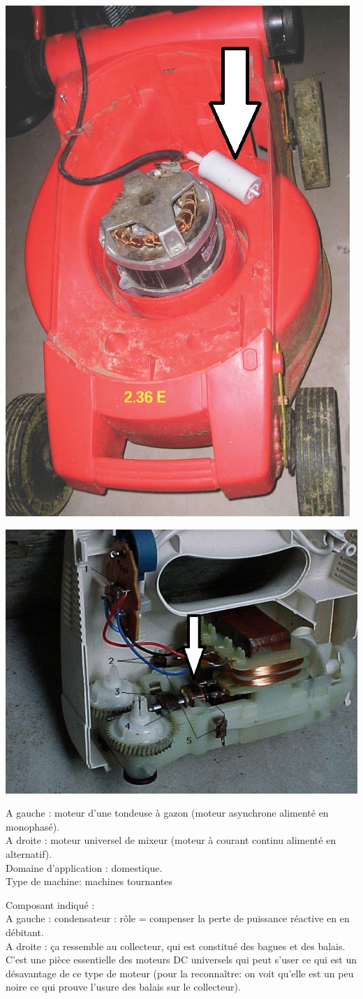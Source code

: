 \begin{questions}
{\begin{minipage}{0.5\textwidth}
\centering
\includegraphics[width= 0.5 \textwidth]{./img/tondeuse}
\end{minipage}
\begin{minipage}{0.5\textwidth}
\centering
\includegraphics[width= 0.7 \textwidth]{./img/mixeur}
\end{minipage}
}
\begin{solution}
A gauche : moteur d'une tondeuse à gazon (moteur asynchrone alimenté en monophasé).\\
A droite : moteur universel de mixeur (moteur à courant continu alimenté en alternatif).\\
Domaine d'application : domestique.\\

Type de machine: machines tournantes

Composant indiqué :\\
A gauche : condensateur : rôle = compenser la perte de puissance réactive en en débitant.\\
A droite : ça ressemble au collecteur, qui est constitué des bagues et des balais. C'est une pièce essentielle des moteurs DC universels qui peut s'user ce qui est un désavantage  de ce type de moteur (pour la reconnaître: on voit qu'elle est un peu noire ce qui prouve l'usure des balais sur le collecteur).
\end{solution}


\end{questions}
